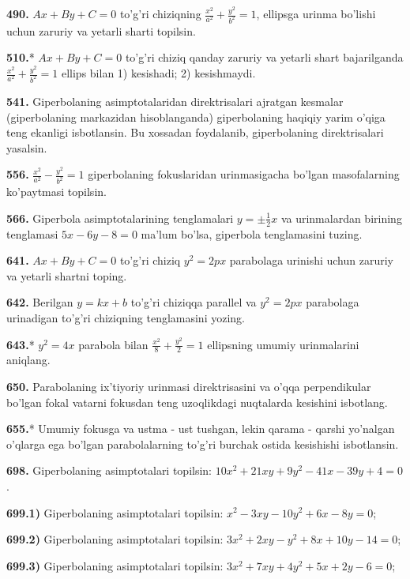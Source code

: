 \textbf{490.} \(Ax + By + C = 0\) to'g'ri chiziqning \(\frac{x^{2}}{a^{2}} + \frac{y^{2}}{b^{2}} = 1\), ellipsga urinma bo'lishi uchun zaruriy va yetarli sharti topilsin.

\textbf{510.}* \(Ax + By + C = 0\) to'g'ri chiziq qanday zaruriy va yetarli shart bajarilganda \(\frac{x^{2}}{a^{2}} + \frac{y^{2}}{b^{2}} = 1\) ellips bilan 1) kesishadi; 2) kesishmaydi.

\textbf{541.} Giperbolaning asimptotalaridan direktrisalari ajratgan kesmalar (giperbolaning markazidan hisoblanganda) giperbolaning haqiqiy yarim o'qiga teng ekanligi isbotlansin. Bu xossadan foydalanib, giperbolaning direktrisalari yasalsin.

\textbf{556.} \(\frac{x^{2}}{a^{2}} - \frac{y^{2}}{b^{2}} = 1\) giperbolaning fokuslaridan urinmasigacha bo'lgan masofalarning ko'paytmasi topilsin.

\textbf{566.} Giperbola asimptotalarining tenglamalari \(y = \pm \frac{1}{2}x\) va urinmalardan birining tenglamasi \(5x - 6y - 8 = 0\) ma'lum bo'lsa, giperbola tenglamasini tuzing.

\textbf{641.} \(Ax + By + C = 0\) to'g'ri chiziq \(y^{2} = 2px\) parabolaga urinishi uchun zaruriy va yetarli shartni toping.

\textbf{642.} Berilgan \(y = kx + b\) to'g'ri chiziqqa parallel va \(y^{2} = 2px\) parabolaga urinadigan to'g'ri chiziqning tenglamasini yozing.

\textbf{643.}* \(y^{2} = 4x\) parabola bilan \(\frac{x^{2}}{8} + \frac{y^{2}}{2} = 1\) ellipsning umumiy urinmalarini aniqlang.

\textbf{650.} Parabolaning ix'tiyoriy urinmasi direktrisasini va o'qqa perpendikular bo'lgan fokal vatarni fokusdan teng uzoqlikdagi nuqtalarda kesishini isbotlang.

\textbf{655.}* Umumiy fokusga va ustma - ust tushgan, lekin qarama - qarshi yo'nalgan o'qlarga ega bo'lgan parabolalarning to'g'ri burchak ostida kesishishi isbotlansin.

\textbf{698.} Giperbolaning asimptotalari topilsin: \(10x^{2} + 21xy + 9y^{2} - 41x - 39y + 4 = 0\).

\textbf{699.1)} Giperbolaning asimptotalari topilsin: \(x^{2} - 3xy - 10y^{2} + 6x - 8y = 0\);

\textbf{699.2)} Giperbolaning asimptotalari topilsin: \(3x^{2} + 2xy - y^{2} + 8x + 10y - 14 = 0\);

\textbf{699.3)} Giperbolaning asimptotalari topilsin: \(3x^{2} + 7xy + 4y^{2} + 5x + 2y - 6 = 0\);

